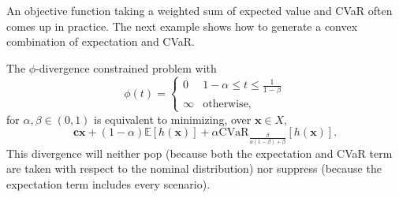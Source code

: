 \documentclass[opre,nonblindrev]{informs3} %
\newcommand{\E}{\mathbb{E}}
\newcommand{\e}[1]{\E \left[ #1 \right]}
\newcommand{\x}{\mathbf{x}}
\renewcommand{\c}{\mathbf{c}}
\begin{document}
An objective function taking a weighted sum of expected value and CVaR often comes up in practice.
The next example shows how to generate a convex combination of expectation and CVaR.

\begin{example}
	\label{ex:cvar_expectation}
	The $\phi$-divergence constrained problem with
	\[
		\phi(t) = 
		\begin{cases}
			0 & 1-\alpha \leq t \leq \frac{1}{1-\beta} \\
			\infty & \text{otherwise},
		\end{cases}
	\]
	for $\alpha,\beta \in (0,1)$ is equivalent to minimizing, over $\x \in X$,
	\[
		\c\x + (1-\alpha)\e{h(\x)} + \alpha \mbox{CVaR}_{\frac{\beta}{\alpha(1-\beta)+\beta}}[h(\x)].
	\]
	This divergence will neither pop (because both the expectation and CVaR term are taken with respect to the nominal distribution) nor suppress (because the expectation term includes every scenario).
\end{example}
\end{document}
